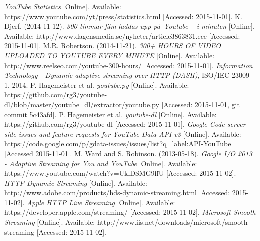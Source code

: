 \begin{thebibliography}{5}
    \footnotesize
        \textit{YouTube Statistics}
        [Online].
        Available:
        https://www.youtube.com/yt/press/statistics.html
        [Accessed: 2015-11-01].
        K. Djerf.
        (2014-11-12).
        \textit{300 timmar film laddas upp p\aa\  Youtube – i minuten}
        [Online].
        Available:
        http://www.dagensmedia.se/nyheter/article3863831.ece
        [Accessed: 2015-11-01].
        M.R. Robertson.
        (2014-11-21).
        \textit{300+ HOURS OF VIDEO UPLOADED TO YOUTUBE EVERY MINUTE}
        [Online].
        Available:
        http://www.reelseo.com/youtube-300-hours/
        [Accessed: 2015-11-01].
        \textit{Information Technology - Dynamic adaptive streaming over HTTP (DASH)},
        ISO/IEC 23009-1, 2014.
        P. Hagemeister et al.
        \textit{youtube.py}
        [Online].
        Available:
        https://github.com/rg3/youtube-dl/blob/master/youtube\_dl/extractor/youtube.py
        [Accessed: 2015-11-01, git commit 5c43afd].
        P. Hagemeister et al.
        \textit{youtube-dl}
        [Online].
        Available:
        https://github.com/rg3/youtube-dl
        [Accessed: 2015-11-01].
        \textit{Google Code server-side issues and feature requests for YouTube Data API v3}
        [Online].
        Available:
        https://code.google.com/p/gdata-issues/issues/list?q=label:API-YouTube
        [Accessed 2015-11-01].
        M. Ward and S. Robinson.
        (2013-05-18).
        \textit{Google I/O 2013 - Adaptive Streaming for You and YouTube}
        [Online].
        Available:
        https://www.youtube.com/watch?v=UklDSMG9ffU
        [Accessed: 2015-11-02].
        \textit{HTTP Dynamic Streaming}
        [Online].
        Available:
        http://www.adobe.com/products/hds-dynamic-streaming.html
        [Accessed: 2015-11-02].
        \textit{Apple HTTP Live Streaming}
        [Online].
        Available:
        https://developer.apple.com/streaming/
        [Accessed: 2015-11-02].
        \textit{Microsoft Smooth Streaming}
        [Online].
        Available:
        http://www.iis.net/downloads/microsoft/smooth-streaming
        [Accessed: 2015-11-02].

\end{thebibliography}
